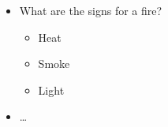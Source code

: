 \begin{itemize}
    \item What are the signs for a fire? 
    \begin{itemize}
        \item Heat
        \item Smoke
        \item Light
    \end{itemize}
    \item \ldots
\end{itemize}
